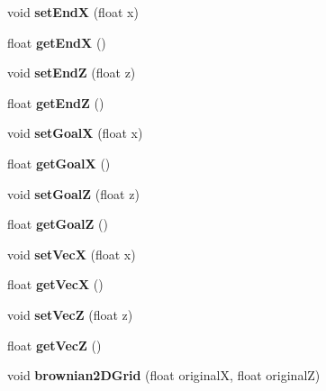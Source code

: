 \begin{DoxyCompactItemize}
\item 
\hypertarget{class_a_i_acadd7e657438405c38e56c691788276e}{void {\bfseries set\-End\-X} (float x)}\label{class_a_i_acadd7e657438405c38e56c691788276e}

\item 
\hypertarget{class_a_i_a96947ebd76fe095d45e5aed85e8a1c09}{float {\bfseries get\-End\-X} ()}\label{class_a_i_a96947ebd76fe095d45e5aed85e8a1c09}

\item 
\hypertarget{class_a_i_ac470a250866a846a6534de12d9ed9aa4}{void {\bfseries set\-End\-Z} (float z)}\label{class_a_i_ac470a250866a846a6534de12d9ed9aa4}

\item 
\hypertarget{class_a_i_a3ea17e664e644c2a815aee1a489d42c2}{float {\bfseries get\-End\-Z} ()}\label{class_a_i_a3ea17e664e644c2a815aee1a489d42c2}

\item 
\hypertarget{class_a_i_a62099687a59608dc1a627821dfe26b2a}{void {\bfseries set\-Goal\-X} (float x)}\label{class_a_i_a62099687a59608dc1a627821dfe26b2a}

\item 
\hypertarget{class_a_i_a003c11f968ab9186e432ab6b585c879f}{float {\bfseries get\-Goal\-X} ()}\label{class_a_i_a003c11f968ab9186e432ab6b585c879f}

\item 
\hypertarget{class_a_i_ae059bb55aeab1fda88d53ddd65bd1bdd}{void {\bfseries set\-Goal\-Z} (float z)}\label{class_a_i_ae059bb55aeab1fda88d53ddd65bd1bdd}

\item 
\hypertarget{class_a_i_a56aa23897db46806a54e1963e4707460}{float {\bfseries get\-Goal\-Z} ()}\label{class_a_i_a56aa23897db46806a54e1963e4707460}

\item 
\hypertarget{class_a_i_ae02ec01d627f81ed3cd3459ade15d21f}{void {\bfseries set\-Vec\-X} (float x)}\label{class_a_i_ae02ec01d627f81ed3cd3459ade15d21f}

\item 
\hypertarget{class_a_i_a607032656c65449a82c3545c0e003cce}{float {\bfseries get\-Vec\-X} ()}\label{class_a_i_a607032656c65449a82c3545c0e003cce}

\item 
\hypertarget{class_a_i_a2be2be0ff7545161f221c828f49d064c}{void {\bfseries set\-Vec\-Z} (float z)}\label{class_a_i_a2be2be0ff7545161f221c828f49d064c}

\item 
\hypertarget{class_a_i_ac5304a7ea0b1a7f45397f941cfa535d4}{float {\bfseries get\-Vec\-Z} ()}\label{class_a_i_ac5304a7ea0b1a7f45397f941cfa535d4}

\item 
\hypertarget{class_a_i_a4e6aceedfcc78ba147a739b4ffa9863e}{void {\bfseries brownian2\-D\-Grid} (float original\-X, float original\-Z)}\label{class_a_i_a4e6aceedfcc78ba147a739b4ffa9863e}

\end{DoxyCompactItemize}



